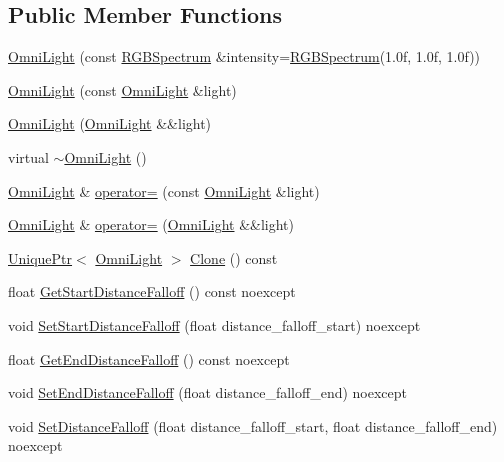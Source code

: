 \subsection*{Public Member Functions}
\begin{DoxyCompactItemize}
\item 
\hyperlink{classmage_1_1_omni_light_a94794dd7c19fcac0c0d0b9d83108513b}{Omni\+Light} (const \hyperlink{structmage_1_1_r_g_b_spectrum}{R\+G\+B\+Spectrum} \&intensity=\hyperlink{structmage_1_1_r_g_b_spectrum}{R\+G\+B\+Spectrum}(1.\+0f, 1.\+0f, 1.\+0f))
\item 
\hyperlink{classmage_1_1_omni_light_accf10bcdf8ed523cfb04129f5345ef92}{Omni\+Light} (const \hyperlink{classmage_1_1_omni_light}{Omni\+Light} \&light)
\item 
\hyperlink{classmage_1_1_omni_light_ae0353cedc67d88be2f4b88374482933d}{Omni\+Light} (\hyperlink{classmage_1_1_omni_light}{Omni\+Light} \&\&light)
\item 
virtual \hyperlink{classmage_1_1_omni_light_af6f4921499b430041966f38aac920b69}{$\sim$\+Omni\+Light} ()
\item 
\hyperlink{classmage_1_1_omni_light}{Omni\+Light} \& \hyperlink{classmage_1_1_omni_light_a7bdce151d327daef5e1f31daedcc4627}{operator=} (const \hyperlink{classmage_1_1_omni_light}{Omni\+Light} \&light)
\item 
\hyperlink{classmage_1_1_omni_light}{Omni\+Light} \& \hyperlink{classmage_1_1_omni_light_a287a54dede61e65efe4493ec20531428}{operator=} (\hyperlink{classmage_1_1_omni_light}{Omni\+Light} \&\&light)
\item 
\hyperlink{namespacemage_a8c307fbcc33bce9b7f2aa4c26c3b95cf}{Unique\+Ptr}$<$ \hyperlink{classmage_1_1_omni_light}{Omni\+Light} $>$ \hyperlink{classmage_1_1_omni_light_a82325924de65733314dcf2b87e926d60}{Clone} () const
\item 
float \hyperlink{classmage_1_1_omni_light_adb7811b447e8b4679b21123c01c6d6fb}{Get\+Start\+Distance\+Falloff} () const noexcept
\item 
void \hyperlink{classmage_1_1_omni_light_ac7d7dbdbaf9abdc6ee3c660d2354c39d}{Set\+Start\+Distance\+Falloff} (float distance\+\_\+falloff\+\_\+start) noexcept
\item 
float \hyperlink{classmage_1_1_omni_light_a1bd4d9eb6a22ae78e1780f142039611c}{Get\+End\+Distance\+Falloff} () const noexcept
\item 
void \hyperlink{classmage_1_1_omni_light_a976808d30573076afcb847724717a121}{Set\+End\+Distance\+Falloff} (float distance\+\_\+falloff\+\_\+end) noexcept
\item 
void \hyperlink{classmage_1_1_omni_light_ad46e519eae108d009c8b77b86d302ed1}{Set\+Distance\+Falloff} (float distance\+\_\+falloff\+\_\+start, float distance\+\_\+falloff\+\_\+end) noexcept
\end{DoxyCompactItemize}
